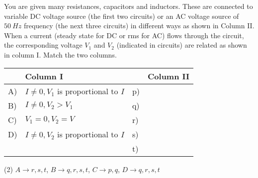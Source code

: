 
\item You are given many resistances, capacitors and inductors. These are connected to variable DC voltage source (the first two circuits) or an AC voltage source of $50\ Hz$ frequency (the next three circuits) in different ways as shown in Column II. When a current (steady state for DC or rms for AC) flows through the circuit, the corresponding voltage $V_1$ and $V_2$ (indicated in circuits) are related as shown in column I. Match the two columns.

\begin{center}
    \renewcommand{\arraystretch}{2}
    \begin{tabular}{p{0.25cm}p{8cm}|p{0.25cm}p{5cm}}
        \hline
        & Column I & & Column II \\
        \hline
        A) & $I \neq 0, V_1$ is proportional to $I$ & p) & 
        \begin{tikzpicture}[scale=0.8, every node/.style={scale=0.8}]
        \end{tikzpicture}\\
        B) & $I \neq 0, V_2 > V_1$ & q) &
        \begin{tikzpicture}[scale=0.8, every node/.style={scale=0.8}]
        \end{tikzpicture}\\
        C) & $V_1 = 0, V_2 = V$ & r) &
        \begin{tikzpicture}[scale=0.8, every node/.style={scale=0.8}]
        \end{tikzpicture}\\
        D) & $I \neq 0, V_2$ is proportional to $I$ & s) &
        \begin{tikzpicture}[scale=0.8, every node/.style={scale=0.8}]
        \end{tikzpicture}\\
        & & t) &
        \begin{tikzpicture}[scale=0.8, every node/.style={scale=0.8}]
        \end{tikzpicture}\\
        \hline
    \end{tabular}
\end{center}

\begin{tasks}(2)
    \task $A \rightarrow r, s, t$, $B \rightarrow q, r, s, t$, $C \rightarrow p, q$, $D \rightarrow q, r, s, t$
\end{tasks}
